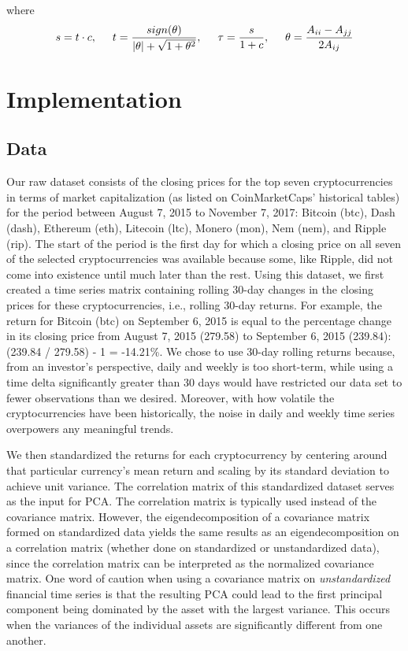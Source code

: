 \documentclass[12pt,twoside]{article}
\begin{document}
where
\[ s=t\cdot c, \hspace{5mm} t = \frac{sign(\theta)}{|\theta|+ \sqrt{1+\theta^2}}, \hspace{5mm} \tau = \frac{s}{1+c}, \hspace{5mm} \theta = \frac{A_{ii}-A_{jj}}{2A_{ij}}  \]

\section{Implementation}
\subsection{Data}
Our raw dataset consists of the closing prices for the top seven cryptocurrencies in terms of market capitalization (as listed on CoinMarketCaps' historical tables) for the period between August 7, 2015 to November 7, 2017: Bitcoin (btc), Dash (dash), Ethereum (eth), Litecoin (ltc), Monero (mon), Nem (nem), and Ripple (rip). The start of the period is the first day for which a closing price on all seven of the selected cryptocurrencies was available because some, like Ripple, did not come into existence until much later than the rest. Using this dataset, we first created a time series matrix containing rolling 30-day changes in the closing prices for these cryptocurrencies, i.e., rolling 30-day returns. For example, the return for Bitcoin (btc) on September 6, 2015 is equal to the percentage change in its closing price from August 7, 2015 (279.58) to September 6, 2015 (239.84): (239.84 / 279.58) - 1 = -14.21\%. We chose to use 30-day rolling returns because, from an investor's perspective, daily and weekly is too short-term, while using a time delta significantly greater than 30 days would have restricted our data set to fewer observations than we desired. Moreover, with how volatile the cryptocurrencies have been historically, the noise in daily and weekly time series overpowers any meaningful trends.

\bigbreak
We then standardized the returns for each cryptocurrency by centering around that particular currency's mean return and scaling by its standard deviation to achieve unit variance. The correlation matrix of this standardized dataset serves as the input for PCA. The correlation matrix is typically used instead of the covariance matrix. However, the eigendecomposition of a covariance matrix formed on standardized data yields the same results as an eigendecomposition on a correlation matrix (whether done on standardized or unstandardized data), since the correlation matrix can be interpreted as the normalized covariance matrix. One word of caution when using a covariance matrix on \textit{unstandardized} financial time series is that the resulting PCA could lead to the first principal component being dominated by the asset with the largest variance. This occurs when the variances of the individual assets are significantly different from one another.
\end{document}
